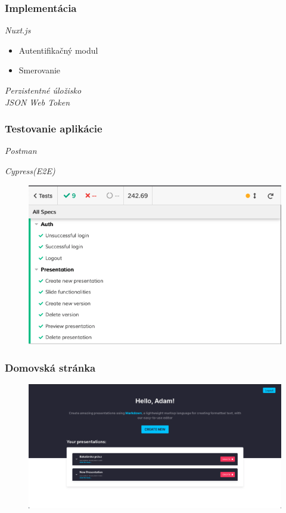 \documentclass[10pt,xcolor=pdflatex,hyperref={unicode}]{beamer}
\begin{document}
\begin{frame}\frametitle{Implementácia}
    \emph{Nuxt.js}
    \begin{itemize}
        \item Autentifikačný modul
        \item Smerovanie
    \end{itemize}
    \vspace{\baselineskip}
    
    \emph{Perzistentné úložisko}\\
    \vspace{\baselineskip}
    \emph{JSON Web Token}
\end{frame}

\begin{frame}\frametitle{Testovanie aplikácie}
    \emph{Postman}
    \vspace{\baselineskip}

    \emph{Cypress(E2E)}
    \begin{figure}[!hbt]
        \centering
        \includegraphics[scale=0.3]{img/cypress.png}
    \end{figure}
\end{frame}

\begin{frame}\frametitle{Domovská stránka}
    \begin{figure}[!hbt]
        \centering
        \includegraphics[scale=0.35]{img/domovska_stranka.pdf}
    \end{figure}
\end{frame}
\end{document}
